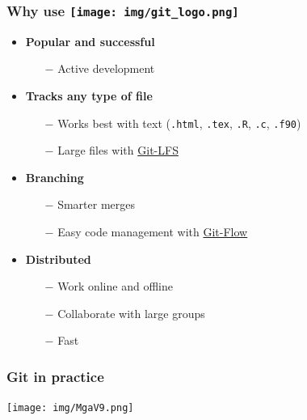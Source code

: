 \documentclass[svgnames]{beamer}
\begin{document}
\begin{frame}[fragile]
    \frametitle{Why use \texttt{[image: img/git\_logo.png]}}
    \begin{itemize}
        \item{ \textbf{Popular and successful}
            \begin{itemize}
                \item[$-$]{Active development}
            \end{itemize}
            }
 
        \item{ \textbf{Tracks any type of file}
            \begin{itemize}
                \item[$-$]{Works best with text (\verb+.html+, \verb+.tex+, \verb+.R+, \verb+.c+, \verb+.f90+)}
                \item[$-$]{Large files with \href{https://git-lfs.github.com/}{Git-LFS}}
            \end{itemize}
            }

        \item { \textbf{Branching}
            \begin{itemize}
                \item[$-$]{Smarter merges}
                \item[$-$]{Easy code management with \href{https://git-flow.readthedocs.io/fr/latest/index.html}{Git-Flow}}
            \end{itemize}
        }
        
        \item { \textbf{Distributed}
            \begin{itemize}
                \item[$-$]{Work online and offline}
                \item[$-$]{Collaborate with large groups}
                \item[$-$]{Fast}
            \end{itemize}
		}         
       
    \end{itemize}
\end{frame}

\begin{frame}
\frametitle{Git in practice}
\centering
\texttt{[image: img/MgaV9.png]}
\end{frame}
\end{document}
